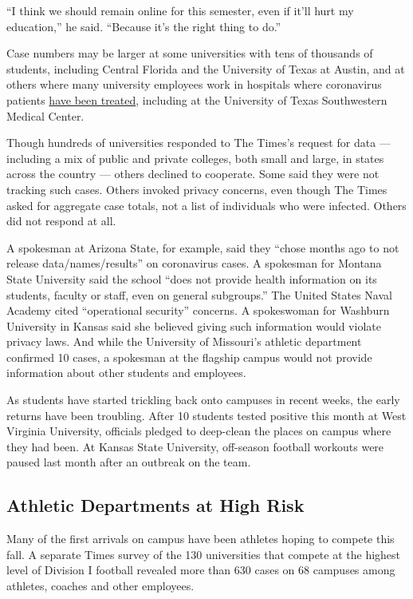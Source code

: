 ``I think we should remain online for this semester, even if it'll hurt
my education,'' he said. ``Because it's the right thing to do.''

Case numbers may be larger at some universities with tens of thousands
of students, including Central Florida and the University of Texas at
Austin, and at others where many university employees work in hospitals
where coronavirus patients
\href{https://www.utsouthwestern.edu/covid-19/}{have been treated},
including at the University of Texas Southwestern Medical Center.

Though hundreds of universities responded to The Times's request for
data --- including a mix of public and private colleges, both small and
large, in states across the country --- others declined to cooperate.
Some said they were not tracking such cases. Others invoked privacy
concerns, even though The Times asked for aggregate case totals, not a
list of individuals who were infected. Others did not respond at all.

A spokesman at Arizona State, for example, said they ``chose months ago
to not release data/names/results'' on coronavirus cases. A spokesman
for Montana State University said the school ``does not provide health
information on its students, faculty or staff, even on general
subgroups.'' The United States Naval Academy cited ``operational
security'' concerns. A spokeswoman for Washburn University in Kansas
said she believed giving such information would violate privacy laws.
And while the University of Missouri's athletic department confirmed 10
cases, a spokesman at the flagship campus would not provide information
about other students and employees.

As students have started trickling back onto campuses in recent weeks,
the early returns have been troubling. After 10 students tested positive
this month at West Virginia University, officials pledged to deep-clean
the places on campus where they had been. At Kansas State University,
off-season football workouts were paused last month after an outbreak on
the team.

\hypertarget{athletic-departments-at-high-risk}{%
\subsection{Athletic Departments at High
Risk}\label{athletic-departments-at-high-risk}}

Many of the first arrivals on campus have been athletes hoping to
compete this fall. A separate Times survey of the 130 universities that
compete at the highest level of Division I football revealed more than
630 cases on 68 campuses among athletes, coaches and other employees.

